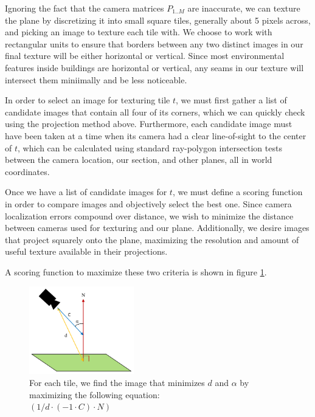 \documentclass[10pt,twocolumn,letterpaper]{article}
\begin{document}
Ignoring the fact that the camera matrices $P_{1..M}$ are inaccurate,
we can texture the plane by discretizing it into small square tiles,
generally about 5 pixels across, and picking an image to texture each
tile with. We choose to work with rectangular units to ensure that
borders between any two distinct images in our final texture will be
either horizontal or vertical. Since most environmental features
inside buildings are horizontal or vertical, any seams in our texture
will intersect them miniimally and be less noticeable.

In order to select an image for texturing tile $t$, we must first
gather a list of candidate images that contain all four of its
corners, which we can quickly check using the projection method
above. Furthermore, each candidate image must have been taken at a
time when its camera had a clear line-of-sight to the center of $t$,
which can be calculated using standard ray-polygon intersection tests
between the camera location, our section, and other planes, all in
world coordinates.

Once we have a list of candidate images for $t$, we must define a
scoring function in order to compare images and objectively select the
best one. Since camera localization errors compound over distance, we
wish to minimize the distance between cameras used for texturing and
our plane. Additionally, we desire images that project squarely onto
the plane, maximizing the resolution and amount of useful texture
available in their projections.

A scoring function to maximize these two criteria is shown in figure
\ref{fig:scoringFunction}.

\begin{figure}
  \centering
  \includegraphics[height=1.5in]{scoringFunction.pdf}
  \caption{For each tile, we find the image that minimizes $d$ and
    $\alpha$ by maximizing the following equation: \\ $(1/d \cdot (-1
    \cdot C) \cdot N)$}
  \label{fig:scoringFunction}
\end{figure}
\end{document}
